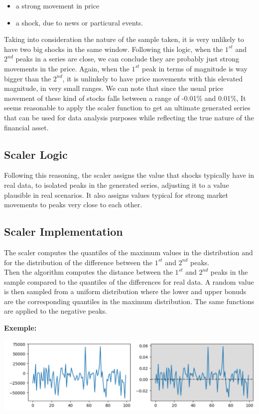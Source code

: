 \documentclass{article}
\begin{document}
\begin{multicols}{2}
    \begin{itemize}
        \item a strong movement in price
        \item a shock, due to news or particural events.
    \end{itemize}  
    Taking into consideration the nature of the sample taken, it is very unlikely to have two big shocks in the same window. Following this logic, when the $1^{st}$ and $2^{nd}$ peaks in a series are close, we can conclude they are probably just strong movements in the price. Again, when the $1^{st}$ peak in terms of magnitude is way bigger than the $2^{nd}$, it is unlinkely to have price movements with this elevated magnitude, in very small ranges. We can note that since the usual price movement of these kind of stocks falls between a range of -0.01\% and 0.01\%, It seems reasonable to apply the scaler function to get an ultimate generated series that can be used for data analysis purposes while reflecting the true nature of the financial asset. 
    \subsection*{Scaler Logic}
    Following this reasoning, the scaler assigns the value that shocks typically have in real data, to isolated peaks in the generated series, adjusting it to a value plausible in real scenarios.
    It also assigns values typical for strong market movements to peaks very close to each other.
    \subsection*{Scaler Implementation}
    The scaler computes the quantiles of the maximum values in the distribution and for the distribution of the difference between the $1^{st}$ and 
    $2^{nd}$ peaks.\\
    Then the algorithm computes the distance between the $1^{st}$ and $2^{nd}$ peaks in the sample compared to the quantiles of the differences for real 
    data. A random value is then sampled from a uniform distribution where the lower and upper bonuds are the corresponding quantiles in the maximum distribution. 
    The same functions are applied to the negative peaks.
    \end{multicols}
    \textbf{Exemple:}
    \begin{center}
        \includegraphics[scale=0.6]{imgs/EX_03.png}
    \end{center}
\end{document}
